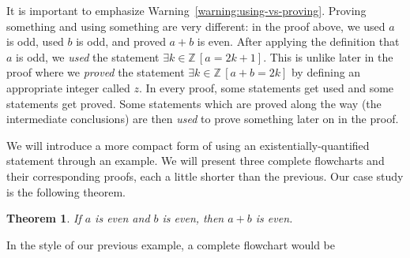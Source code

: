 \documentclass{book}
\newcounter{ekcounter}%
\theoremstyle{ekimcustom}
\newtheorem{theorem}[ekcounter]{Theorem}
\begin{document}
It is important to emphasize Warning~\ref{warning:using-vs-proving}. Proving something and using something are very different: in the proof above, we used $a$ is odd, used $b$ is odd, and proved $a+b$ is even. After applying the definition that $a$ is odd, we \emph{used} the statement $\exists k \in \mathbb{Z}\, [a=2k+1]$. This is unlike later in the proof where we \emph{proved} the statement $\exists k \in \mathbb{Z}\,[a+b=2k]$ by defining an appropriate integer called $z$. In every proof, some statements get used and some statements get proved. Some statements which are proved along the way (the intermediate conclusions) are then \emph{used} to prove something later on in the proof.

We will introduce a more compact form of using an existentially-quantified statement through an example. We will present three complete flowcharts and their corresponding proofs, each a little shorter than the previous. Our case study is the following theorem.
\begin{theorem}\label{theorem:sum-of-evens}
If $a$ is even and $b$ is even, then $a+b$ is even.
\end{theorem}
In the style of our previous example, a complete flowchart would be
\end{document}

